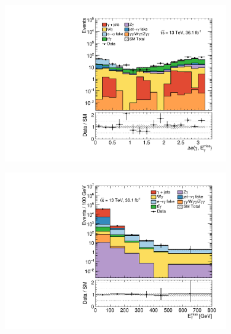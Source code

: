 \documentclass[10pt, compress,spanish]{beamer}
\begin{document}
\begin{frame}[fragile]
\begin{columns}
\begin{column}{0.45\textwidth}
\begin{figure}
\centering
\includegraphics[width=0.85\textwidth]{can_VRE_dphi_gammet_afterFit.pdf}
\end{figure}
\vspace{-0.8cm}
\begin{figure}
\centering
\includegraphics[width=0.85\textwidth]{can_VRE_met_et_afterFit.pdf}
\end{figure}
\end{column}

\end{columns}



\end{frame}



\end{document}
